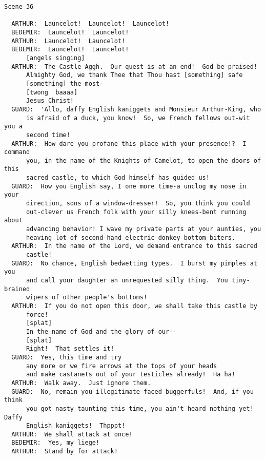 \documentclass{article}
\begin{document}
\begin{verbatim}
Scene 36

  ARTHUR:  Launcelot!  Launcelot!  Launcelot!
  BEDEMIR:  Launcelot!  Launcelot!
  ARTHUR:  Launcelot!  Launcelot!
  BEDEMIR:  Launcelot!  Launcelot!
      [angels singing]
  ARTHUR:  The Castle Aggh.  Our quest is at an end!  God be praised!
      Almighty God, we thank Thee that Thou hast [something] safe
      [something] the most-
      [twong  baaaa]
      Jesus Christ!
  GUARD:  'Allo, daffy English kaniggets and Monsieur Arthur-King, who
      is afraid of a duck, you know!  So, we French fellows out-wit you a
      second time!
  ARTHUR:  How dare you profane this place with your presence!?  I command
      you, in the name of the Knights of Camelot, to open the doors of this
      sacred castle, to which God himself has guided us!
  GUARD:  How you English say, I one more time-a unclog my nose in your
      direction, sons of a window-dresser!  So, you think you could
      out-clever us French folk with your silly knees-bent running about
      advancing behavior! I wave my private parts at your aunties, you
      heaving lot of second-hand electric donkey bottom biters.
  ARTHUR:  In the name of the Lord, we demand entrance to this sacred
      castle!
  GUARD:  No chance, English bedwetting types.  I burst my pimples at you
      and call your daughter an unrequested silly thing.  You tiny-brained
      wipers of other people's bottoms!
  ARTHUR:  If you do not open this door, we shall take this castle by
      force!
      [splat]
      In the name of God and the glory of our--
      [splat]
      Right!  That settles it!
  GUARD:  Yes, this time and try
      any more or we fire arrows at the tops of your heads
      and make castanets out of your testicles already!  Ha ha!
  ARTHUR:  Walk away.  Just ignore them.
  GUARD:  No, remain you illegitimate faced buggerfuls!  And, if you think
      you got nasty taunting this time, you ain't heard nothing yet!  Daffy
      English kaniggets!  Thpppt!
  ARTHUR:  We shall attack at once!
  BEDEMIR:  Yes, my liege!
  ARTHUR:  Stand by for attack!
\end{verbatim}
\end{document}
